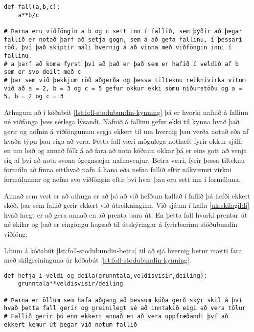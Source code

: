 \begin{lstlisting}[caption=Stöðubundin viðföng kynnt, label=lst:foll-stodubundin-kynning]
def fall(a,b,c):
	a**b/c
	
# Þarna eru viðföngin a b og c sett inn í fallið, sem þýðir að þegar fallið er notað þarf að setja gögn, sem á að gefa fallinu, í þessari röð, því það skiptir máli hvernig á að vinna með viðföngin inni í fallinu.
# a þarf að koma fyrst því að það er það sem er hafið í veldið af b sem er svo deilt með c
# þar sem við þekkjum röð aðgerða og þessa tilteknu reiknivirka vitum við að a = 2, b = 3 og c = 5 gefur okkur ekki sömu niðurstöðu og a = 5, b = 2 og c = 3
\end{lstlisting}

Athugum að í kóðabút \ref{lst:foll-stodubundin-kynning} þá er hvorki nafnið á fallinu né viðfanga þess sérlega lýsandi.
Nafnið á fallinu gefur ekki til kynna hvað það gerir og nöfnin á viðföngunum segja ekkert til um hvernig þau verða notuð eða af hvaða týpu þau eiga að vera.
Þetta fall væri mögulega nothæft fyrir okkur sjálf, en um leið og annað fólk á að fara að nota kóðann okkar þá er eins gott að venja sig af því að nota svona ógegnsæjar nafnavenjur.
Betra væri, fyrir þessa tilteknu formúlu að finna eitthvað nafn á hana eða nefna fallið eftir nákvæmri virkni formúlunnar og nefna svo viðföngin eftir því hvar þau eru sett inn í formúluna.

Annað sem vert er að athuga er að þó að við hefðum kallað í fallið þá hefði ekkert skéð, þar sem fallið gerir ekkert við útreikninginn.
Við sjáum í kafla \ref{uk:skilagildi} hvað hægt er að gera annað en að prenta bara út.
En þetta fall hvorki prentar út né skilar og það er eingöngu hugsað til útskýringar á fyrirbærinu stöðubundin viðföng.

Lítum á kóðabút \ref{lst:foll-stodubundin-betra} til að sjá hvernig betur mætti fara með skilgreininguna úr kóðabút \ref{lst:foll-stodubundin-kynning}.

\begin{lstlisting}[caption=Stöðubundin viðföng kynnt, label=lst:foll-stodubundin-betra]
def hefja_i_veldi_og_deila(grunntala,veldisvisir,deiling):	
	grunntala**veldisvisir/deiling

# Þarna er öllum sem hafa aðgang að þessum kóða gerð skýr skil á því hvað þetta fall gerir og greinilegt sé að inntakið eigi að vera tölur
# Fallið gerir þó enn ekkert annað en að vera uppfræðandi því að ekkert kemur út þegar við notum fallið
\end{lstlisting}

